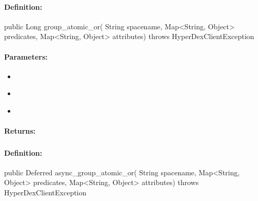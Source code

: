\paragraph{Definition:}
\begin{javacode}
public Long group_atomic_or(
        String spacename,
        Map<String, Object> predicates,
        Map<String, Object> attributes) throws HyperDexClientException
\end{javacode}

\paragraph{Parameters:}
\begin{itemize}[noitemsep]
\item {}\\

\item {}\\

\item {}\\

\end{itemize}

\paragraph{Returns:}


\pagebreak
\subsubsection{}
\label{api:java:async_group_atomic_or}


\paragraph{Definition:}
\begin{javacode}
public Deferred async_group_atomic_or(
        String spacename,
        Map<String, Object> predicates,
        Map<String, Object> attributes) throws HyperDexClientException
\end{javacode}

